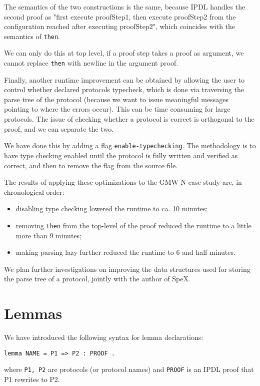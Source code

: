\documentclass{article}
\begin{document}
The semantics of the two constructions is the same, because IPDL handles the 
second proof as "first execute proofStep1, then execute proofStep2 from the
configuration reached after executing proofStep2", which coincides with the
semantics of \verb+then+.

We can only do this at top level, if a proof step takes a proof as argument, we 
cannot replace \verb+then+ with newline in the argument proof.

Finally, another runtime improvement can be obtained by allowing the user to control
whether declared protocols typecheck, which is done via traversing the parse tree of the protocol (because we want to issue meaningful messages pointing to where the errors occur). This can be time consuming for large protocols.
The issue of checking whether a 
protocol is correct is orthogonal to the proof, and we can separate the two.

We have done this by adding a flag
\verb+enable-typechecking+. The methodology is to have type checking enabled until
the protocol is fully written and verified as correct, and then to remove the flag
from the source file.

The results of applying these optimizations to the GMW-N case study are, in 
chronological order:
\begin{itemize}
\item disabling type checking lowered the runtime to ca. 10 minutes;
\item removing \verb+then+ from the top-level of the proof reduced the runtime to a little more than 9 minutes;
\item making parsing lazy further reduced the runtime to 6 and half minutes. 
\end{itemize}

We plan further investigations on improving the data structures used for storing 
the parse tree of a protocol,  jointly with the author of SpeX.

\section{Lemmas}

We have introduced the following syntax for lemma declarations:
\begin{verbatim}
lemma NAME = P1 => P2 : PROOF .
\end{verbatim}
\noindent where \verb+P1, P2+ are protocols (or protocol names) and
\verb+PROOF+ is an IPDL proof that P1 rewrites to P2.
\end{document}
